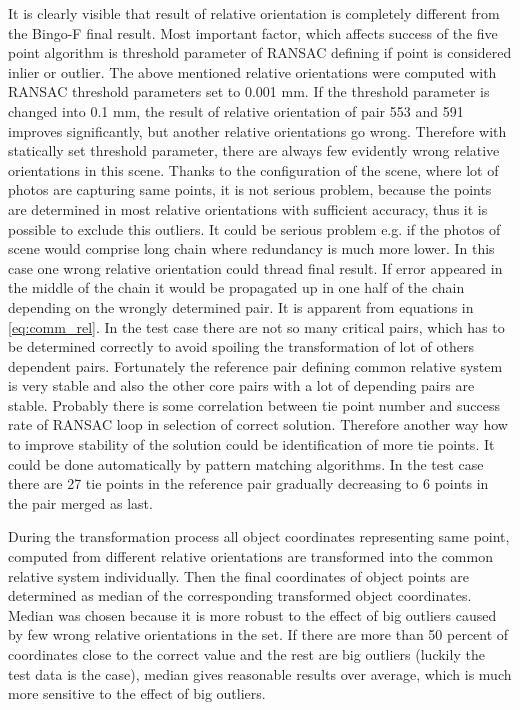 \documentclass[a4paper,12pt]{article}
\begin{document}
It is clearly visible that result of relative orientation is completely different from the Bingo-F final result.
Most important factor, which affects success of the five point algorithm is threshold parameter of RANSAC defining 
if point is considered inlier or outlier.
The above mentioned relative orientations were computed with RANSAC threshold parameters set to 0.001 mm.
If the threshold parameter is changed into 0.1 mm, the result of relative orientation of pair 553 and 591 improves significantly,
but another relative orientations go wrong. Therefore with statically set threshold parameter, there are always 
few evidently wrong relative orientations in this scene. Thanks to the configuration of the scene, where lot of photos are 
capturing same points, it is  not serious problem, because the points are determined in most relative orientations  with 
sufficient accuracy, thus it is possible to exclude this outliers. It could be serious problem e.g. if the photos 
of scene would comprise long chain where redundancy is much more lower.   
In this case one wrong relative orientation could thread final result. If error appeared in the middle 
of the chain it would  be propagated up in one half of the chain  depending on the wrongly
determined pair. It is apparent from equations in \eqref{eq:comm_rel}. 
In the test case there are not so many critical pairs, which has to be determined correctly to avoid spoiling the transformation 
of lot of others dependent pairs. Fortunately the reference pair defining common relative system is very stable and also 
the other core pairs with a lot of depending pairs are stable. 
Probably there is some correlation between tie point number 
and success rate of RANSAC loop in selection of correct solution. 
Therefore another way how to improve stability of the solution 
could be identification of more tie points. It could be done automatically by pattern matching algorithms. 
In the test case there 
are 27 tie points in the reference pair gradually decreasing to 6 points in the pair merged as last.

During the transformation process all object coordinates representing same point, computed from different relative orientations are 
transformed into  the common relative system individually. Then the final coordinates of object points are determined as median
of the corresponding transformed object coordinates. Median was chosen because it is more robust to the effect of 
big outliers caused by few wrong relative orientations in the set. If there are more than 50 percent of coordinates 
close to the correct value and the rest are big outliers (luckily the test data is the case), median gives reasonable results over average,
which is much more sensitive to the effect of big outliers. 
\end{document}
